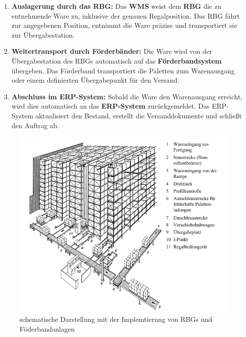 \begin{enumerate}
	\item \textbf{Auslagerung durch das RBG:}  
	Das \textbf{WMS} weist dem \textbf{RBG} die zu entnehmende Ware zu, inklusive der genauen Regalposition. Das RBG fährt zur angegebenen Position, entnimmt die Ware präzise und transportiert sie zur Übergabestation.
	
	\item \textbf{Weitertransport durch Förderbänder:}  
	Die Ware wird von der Übergabestation des RBGs automatisch auf das \textbf{Förderbandsystem} übergeben. Das Förderband transportiert die Paletten zum Warenausgang oder einem definierten Übergabepunkt für den Versand.
	
	\item \textbf{Abschluss im ERP-System:}  
	Sobald die Ware den Warenausgang erreicht, wird dies automatisch an das \textbf{ERP-System} zurückgemeldet. Das ERP-System aktualisiert den Bestand, erstellt die Versanddokumente und schließt den Auftrag ab.
	
\end{enumerate}

\begin{figure}[H]
	\centering
	\includegraphics[width=0.7\linewidth]{images/skizze-Aufbau}
	\caption{schematische Darstellung mit der Implemtierung von RBGs und Föderbandanlagen}
	\label{fig:skizze-aufbau}
\end{figure}